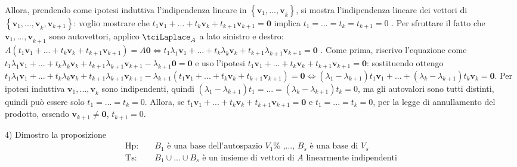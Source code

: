 \documentclass{article}
\begin{document}
Allora, prendendo come ipotesi induttiva l'indipendenza lineare in $\left\{ 
\mathbf{v}_{1}\mathbf{,...,v}_{k}\right\} $, si mostra l'indipendenza
lineare dei vettori di $\left\{ \mathbf{v}_{1}\mathbf{,...,v}_{k},\mathbf{v}%
_{k+1}\right\} $: voglio mostrare che $t_{1}\mathbf{v}_{1}+...+t_{k}\mathbf{v%
}_{k}+t_{k+1}\mathbf{v}_{k+1}\mathbf{=0}$ implica $t_{1}=...=t_{k}=t_{k+1}=0$%
. Per sfruttare il fatto che $\mathbf{v}_{1}\mathbf{,...,v}_{k+1}$ sono
autovettori, applico $\tciLaplace _{A}$ a lato sinistro e destro: $A\left(
t_{1}\mathbf{v}_{1}+...+t_{k}\mathbf{v}_{k}+t_{k+1}\mathbf{v}_{k+1}\right) =A%
\mathbf{0}\Longleftrightarrow t_{1}\lambda _{1}\mathbf{v}_{1}+...+t_{k}%
\lambda _{k}\mathbf{v}_{k}+t_{k+1}\lambda _{k+1}\mathbf{v}_{k+1}=\mathbf{0}$%
. Come prima, riscrivo l'equazione come $t_{1}\lambda _{1}\mathbf{v}%
_{1}+...+t_{k}\lambda _{k}\mathbf{v}_{k}+t_{k+1}\lambda _{k+1}\mathbf{v}%
_{k+1}-\lambda _{k+1}\mathbf{0}=\mathbf{0}$ e uso l'ipotesi $t_{1}\mathbf{v}%
_{1}+...+t_{k}\mathbf{v}_{k}+t_{k+1}\mathbf{v}_{k+1}\mathbf{=0}$:
sostituendo ottengo $t_{1}\lambda _{1}\mathbf{v}_{1}+...+t_{k}\lambda _{k}%
\mathbf{v}_{k}+t_{k+1}\lambda _{k+1}\mathbf{v}_{k+1}-\lambda _{k+1}\left(
t_{1}\mathbf{v}_{1}+...+t_{k}\mathbf{v}_{k}+t_{k+1}\mathbf{v}_{k+1}\right) =%
\mathbf{0\Longleftrightarrow }\left( \lambda _{1}-\lambda _{k+1}\right) t_{1}%
\mathbf{v}_{1}+...+\left( \lambda _{k}-\lambda _{k+1}\right) t_{k}\mathbf{v}%
_{k}=\mathbf{0}$. Per ipotesi induttiva $\mathbf{v}_{1}\mathbf{,...,v}_{k}$
sono indipendenti, quindi $\left( \lambda _{1}-\lambda _{k+1}\right)
t_{1}=...=\left( \lambda _{k}-\lambda _{k+1}\right) t_{k}=0$, ma gli
autovalori sono tutti distinti, quindi pu\`{o} essere solo $%
t_{1}=...=t_{k}=0 $. Allora, se $t_{1}\mathbf{v}_{1}+...+t_{k}\mathbf{v}%
_{k}+t_{k+1}\mathbf{v}_{k+1}\mathbf{=0}$ e $t_{1}=...=t_{k}=0$, per la legge
di annullamento del prodotto, essendo $\mathbf{v}_{k+1}\mathbf{\neq 0}$, $%
t_{k+1}=0$.

4) Dimostro la proposizione%
\begin{eqnarray*}
\text{Hp}\text{: } &&B_{1}\text{ \`{e} una base dell'autospazio }V_{1}\text{%
,..., }B_{s}\text{ \`{e} una base di }V_{s} \\
\text{Ts}\text{: } &&B_{1}\cup ...\cup B_{s}\text{ \`{e} un insieme di
vettori di }A\text{ linearmente indipendenti}
\end{eqnarray*}
\end{document}
